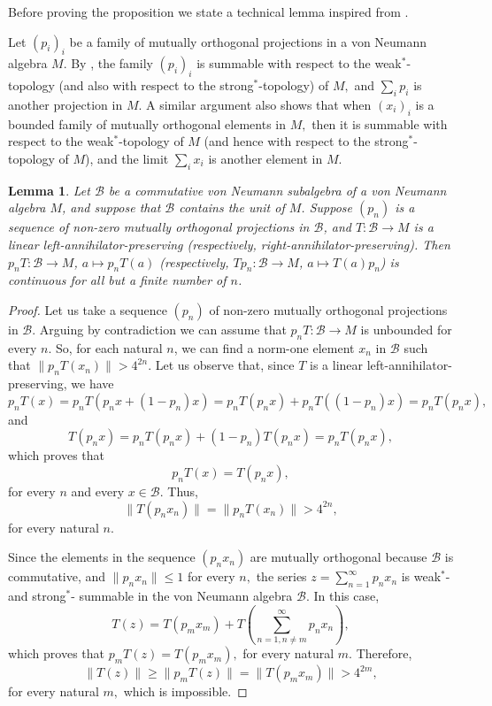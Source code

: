 \documentclass[11pt]{amsart}
\newtheorem{lemma}[theorem]{Lemma}
\begin{document}
Before proving the proposition we state a technical lemma inspired from \cite[Lemma 9.1]{Sinc76}.\smallskip

Let $(p_i)_i$ be a family of mutually orthogonal projections in a von Neumann algebra $M$. By \cite[page 30]{Sak}, the family $(p_i)_i$ is summable with respect to the weak$^*$-topology (and also with respect to the strong$^*$-topology) of $M,$ and $\displaystyle \sum_{i} p_i$ is another projection in $M$. A similar argument also shows that when $(x_i)_i$ is a bounded family of mutually orthogonal elements in $M,$ then it is summable with respect to the weak$^*$-topology of $M$ (and hence with respect to the strong$^*$-topology of $M$), and the limit  $\displaystyle \sum_{i} x_i$ is another element in $M.$

\begin{lemma}\label{l infinite sequence of m orthogo projections} Let $\mathcal{B}$ be a commutative von Neumann subalgebra of a von Neumann algebra $M$, and suppose that $\mathcal{B}$ contains the unit of $M$. Suppose $(p_n)$ is a sequence of non-zero mutually orthogonal projections in $\mathcal{B}$, and  $T: \mathcal{B} \to M$ is a linear left-annihilator-preserving {\rm(}respectively, \emph{right-annihilator-preserving}{\rm)}. Then $p_n T: \mathcal{B} \to M$, $a\mapsto p_n T(a)$ {\rm(}respectively, $ Tp_n: \mathcal{B} \to M$, $a\mapsto T(a) p_n ${\rm)} is continuous for all but a finite number of $n$.
\end{lemma}

\begin{proof} Let us take a sequence $(p_n)$ of non-zero mutually orthogonal projections in $\mathcal{B}$. Arguing by contradiction we can assume that $p_n T: \mathcal{B} \to M $ is unbounded for every $n.$ So, for each natural $n$, we can find a norm-one element $x_n$ in $\mathcal{B}$ such that $\|p_n T(x_n)\| > 4^{2n}.$ Let us observe that, since $T$ is a  linear left-annihilator-preserving, we have $$p_n T(x ) = p_n T( p_n x + (1-p_n) x) =  p_n T( p_n x )  + p_n T( (1-p_n) x) = p_n T(p_n x),$$ and $$T(p_n x) = p_n T(p_n x) + (1-p_n ) T(p_n x) = p_n T(p_n x),$$ which proves that \begin{equation}\label{eq trick for left annihilator preserving} p_n T(x ) = T(p_n  x ),
 \end{equation}for every $n$ and every $x\in \mathcal{B}$. Thus, $$\| T (p_n x_n ) \| = \|p_n T(x_n)\| > 4^{2n},$$ for every natural $n.$\smallskip

Since the elements in the sequence $(p_n x_n)$ are mutually orthogonal because $\mathcal{B}$ is commutative,  and $\|p_n x_n\|\leq 1$ for every $n,$ the series $\displaystyle z= \sum_{n=1}^{\infty} p_n x_n$ is weak$^*$- and strong$^*$- summable in the von Neumann algebra $\mathcal{B}$. In this case,  $$T(z) = T(p_m x_m ) + T\left( \sum_{n=1, n\neq m}^{\infty} p_n x_n \right) ,$$ which proves that $p_m T(z) =  T(p_m x_m ),$ for every natural $m$. Therefore, $$\| T(z) \| \geq \|p_m T(z) \| = \|T(p_m x_m)\| > 4^{2m},$$ for every natural $m,$ which is impossible.
\end{proof}
\end{document}

